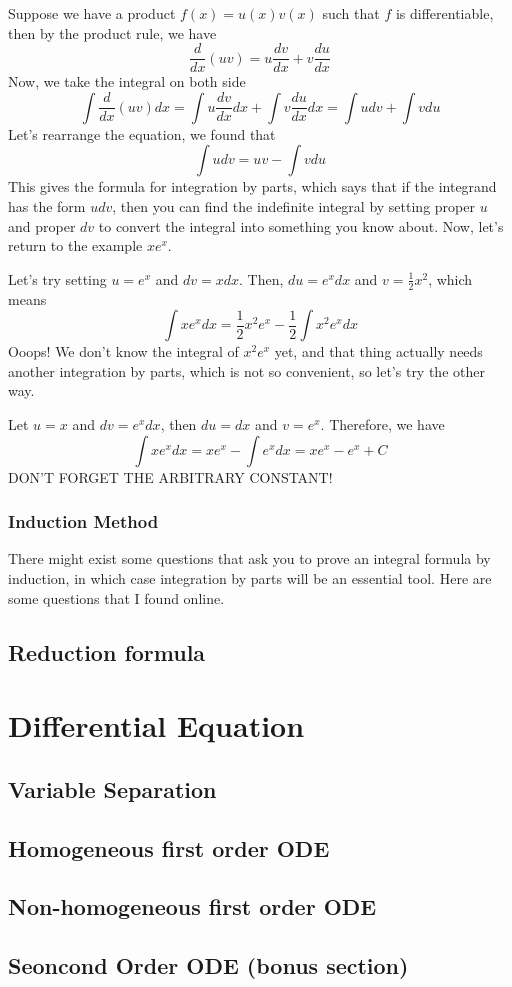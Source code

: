 \documentclass{article}
\theoremstyle{definition}
\theoremstyle{definition}
\theoremstyle{definition}
\theoremstyle{definition}
\theoremstyle{definition}
\theoremstyle{definition}
\theoremstyle{definition}
\theoremstyle{definition}
\theoremstyle{definition}
\begin{document}
Suppose we have a product $f(x)=u(x)v(x)$ such that $f$ is differentiable, then by the product rule, we have 
\[\dfrac{d}{dx}(uv)=u\dfrac{dv}{dx}+v\dfrac{du}{dx}\]
Now, we take the integral on both side
\[
\int \dfrac{d}{dx}(uv)dx=\int u\dfrac{dv}{dx}dx+\int v\dfrac{du}{dx}dx=\int udv+\int vdu
\]
Let's rearrange the equation, we found that 
\[
\int udv=uv-\int vdu
\]
This gives the formula for integration by parts, which says that if the integrand has the form $udv$, then you can find the indefinite integral by setting proper $u$ and proper $dv$ to convert the integral into something you know about. Now, let's return to the example $xe^x$.

Let's try setting $u=e^x$ and $dv=xdx$. Then, $du=e^xdx$ and $v=\frac{1}{2}x^2$, which means
\[
\int xe^xdx=\dfrac{1}{2}x^2e^x-\dfrac{1}{2}\int x^2e^xdx
\]
Ooops! We don't know the integral of $x^2e^x$ yet, and that thing actually needs another integration by parts, which is not so convenient, so let's try the other way.

Let $u=x$ and $dv= e^xdx$, then $du=dx$ and $v=e^x$. Therefore, we have
\[
\int xe^xdx=xe^x-\int e^xdx=xe^x-e^x+C
\]
DON'T FORGET THE ARBITRARY CONSTANT!

\subsubsection{Induction Method}
There might exist some questions that ask you to prove an integral formula by induction, in which case integration by parts will be an essential tool. Here are some questions that I found online.
\subsection{Reduction formula}

\section{Differential Equation}
\subsection{Variable Separation}
\subsection{Homogeneous first order ODE}
\subsection{Non-homogeneous first order ODE}
\subsection{Seoncond Order ODE (bonus section)}
\end{document}
